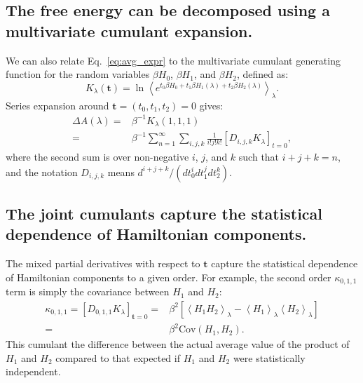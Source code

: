 \documentclass{article}
\let\vec\mathbf
\begin{document}
\subsection{The free energy can be decomposed using a multivariate cumulant expansion.}

We can also relate Eq.~\ref{eq:avg_expr} to the multivariate cumulant generating function for the random variables $\beta H_0$, $\beta H_1$, and $\beta H_2$, defined as:
\begin{equation}
K_\lambda(\vec t) =
	\ln \left\langle 
    	e^{t_0 \beta H_0 + t_1 \beta H_1(\lambda) + t_2 \beta H_2(\lambda)}
    \right\rangle_\lambda.
\end{equation}
Series expansion around $\vec t = (t_0, t_1, t_2) = 0$ gives:
\begin{align}
\Delta A(\lambda) =& \beta^{-1} K_\lambda(1, 1, 1) \nonumber\\
                  =& \beta^{-1} \sum_{n=1}^{\infty}
	        			\sum_{i,j,k}
            			\frac{1}{i!j!k!}\left[ D_{i,j,k} K_\lambda\right]_{t=0},
\end{align}
where the second sum is over non-negative $i$, $j$, and $k$ such that $i + j + k = n$, and the notation $D_{i,j,k}$ means $d^{i+j+k} /(d t_0^i d t_1^j d t_2^k)$.


\subsection{The joint cumulants capture the statistical dependence of Hamiltonian components.}

The mixed partial derivatives with respect to $\vec t$ capture the statistical dependence of Hamiltonian components to a given order. For example, the second order $\kappa_{0,1,1}$ term is simply the covariance between $H_1$ and $H_2$:
\begin{align}
\kappa_{0, 1, 1} = [D_{0, 1, 1} K_\lambda]_{\vec t=0} =&
	\beta^2 \left[
    	\left\langle H_1 H_2 \right\rangle_\lambda -
		\left\langle H_1 \right\rangle_\lambda 
		\left\langle H_2 \right\rangle_\lambda
    \right] \nonumber\\
    =&
    \beta^2 \mathrm{Cov}(H_1,H_2).              
\end{align}
This cumulant the difference between the actual average value of the product of $H_1$ and $H_2$ compared to that expected if $H_1$ and $H_2$ were statistically independent.
\end{document}
